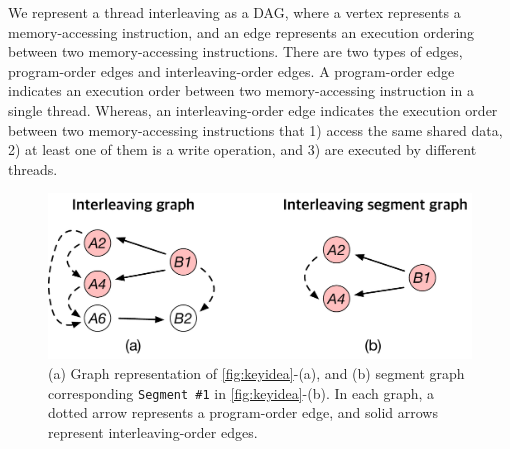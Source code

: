 %




We represent a thread interleaving as a DAG, where
%
a vertex represents a memory-accessing instruction, and an edge
represents an execution ordering between two memory-accessing
instructions. There are two types of edges,
program-order edges and interleaving-order edges.
%
A program-order edge indicates an execution order between two
memory-accessing instruction in a single thread.  Whereas, an
interleaving-order edge indicates the execution order between two
memory-accessing instructions that 1) access the same shared data, 2)
at least one of them is a write operation, and 3) are executed by
different threads.

\begin{figure}[t]
  \centering
  \includegraphics[width=0.8\linewidth]{fig/interleavingsegmentgraph.pdf}
  \caption{(a) Graph representation of \autoref{fig:keyidea}-(a), and
    (b) segment graph corresponding \texttt{Segment \#1} in
    \autoref{fig:keyidea}-(b). In each graph, a dotted arrow
    represents a program-order edge, and solid arrows represent
    interleaving-order edges.}
  \label{fig:interleavingsegmentgraph}
\end{figure}

%


